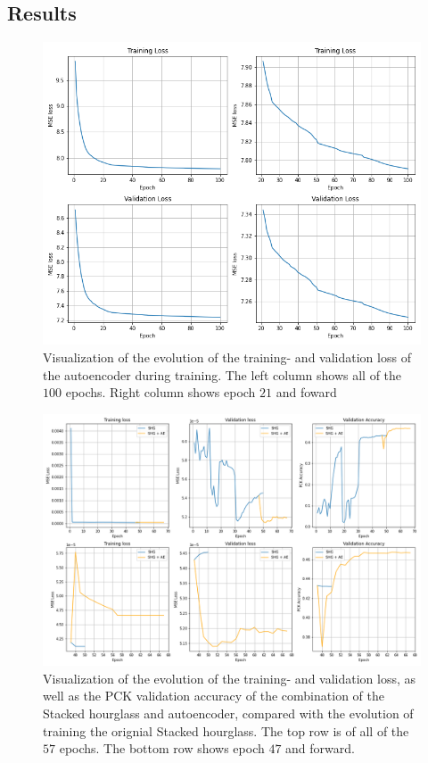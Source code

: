 \documentclass[./main.tex]{subfiles}
\begin{document}
\subsection{Results}\label{sec:improv_results}
\begin{figure}[htbp]
    \centering
    \includegraphics[height = 10 cm]{entities/AE_evolution.png}
    \caption{Visualization of the evolution of the training- and validation loss of the autoencoder during training. The left column shows all of the $100$ epochs. Right column shows epoch $21$ and foward}
    \label{fig:AE_evolution}
\end{figure}
\begin{figure}[htb]
    \centering
    \includegraphics[width = \textwidth]{entities//SHG_AE_Evolution.png}
    \caption{Visualization of the evolution of the training- and validation loss, as well as the PCK validation accuracy of the combination of the Stacked hourglass and autoencoder, compared with the evolution of training the orignial Stacked hourglass. The top row is of all of the $57$ epochs. The bottom row shows epoch $47$ and forward.}
    \label{fig:SHG_AE_evolution}
\end{figure}
\end{document}
